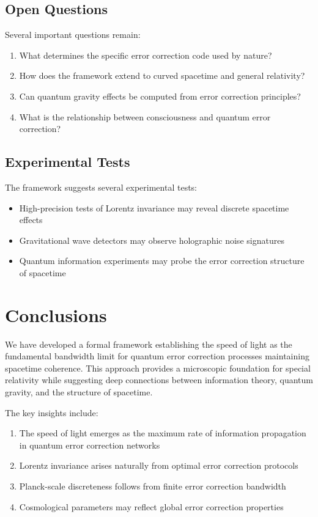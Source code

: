 \documentclass[12pt]{article}
\begin{document}
\subsection{Open Questions}

Several important questions remain:

\begin{enumerate}
\item What determines the specific error correction code used by nature?
\item How does the framework extend to curved spacetime and general relativity?
\item Can quantum gravity effects be computed from error correction principles?
\item What is the relationship between consciousness and quantum error correction?
\end{enumerate}

\subsection{Experimental Tests}

The framework suggests several experimental tests:

\begin{itemize}
\item High-precision tests of Lorentz invariance may reveal discrete spacetime effects
\item Gravitational wave detectors may observe holographic noise signatures
\item Quantum information experiments may probe the error correction structure of spacetime
\end{itemize}

\section{Conclusions}

We have developed a formal framework establishing the speed of light as the fundamental bandwidth limit for quantum error correction processes maintaining spacetime coherence. This approach provides a microscopic foundation for special relativity while suggesting deep connections between information theory, quantum gravity, and the structure of spacetime.

The key insights include:

\begin{enumerate}
\item The speed of light emerges as the maximum rate of information propagation in quantum error correction networks
\item Lorentz invariance arises naturally from optimal error correction protocols
\item Planck-scale discreteness follows from finite error correction bandwidth
\item Cosmological parameters may reflect global error correction properties
\end{enumerate}
\end{document}
